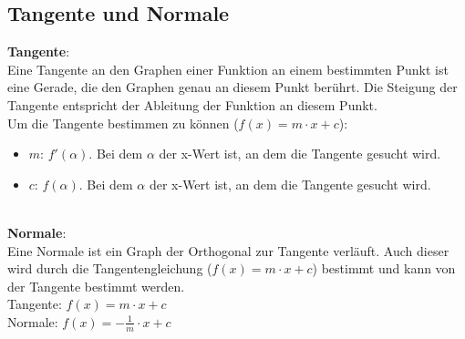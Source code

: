 \subsection{Tangente und Normale}
\textbf{Tangente}: \\
Eine Tangente an den Graphen einer Funktion an einem bestimmten Punkt ist eine Gerade, 
die den Graphen genau an diesem Punkt berührt. 
Die Steigung der Tangente entspricht der Ableitung der Funktion an diesem Punkt. \\
Um die Tangente bestimmen zu können ($f(x) = m\cdot x + c$):
\begin{itemize}
    \item $m$: $f'(\alpha)$. Bei dem $\alpha$ der x-Wert ist, an dem die Tangente gesucht wird.
    \item $c$: $f(\alpha)$. Bei dem $\alpha$ der x-Wert ist, an dem die Tangente gesucht wird.
\end{itemize} 
\
\\
\textbf{Normale}: \\
Eine Normale ist ein Graph der Orthogonal zur Tangente verläuft. 
Auch dieser wird durch die Tangentengleichung ($f(x) = m\cdot x + c$) bestimmt und kann von der Tangente bestimmt werden. \\
Tangente: $f(x) = m \cdot x + c$ \\
Normale: 
$
f(x) = -\frac{1}{m} \cdot x + c
$
